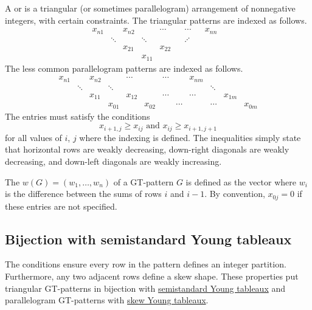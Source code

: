 A \label{gtPattern} or 
is a triangular (or sometimes parallelogram) arrangement of nonnegative integers,
with certain constraints.
The triangular patterns are indexed as follows.
\[
\begin{matrix}
x_{n1} & & x_{n2} & & \cdots & & \cdots & & x_{nn} \\
 & \ddots & & \ddots &  & &  \iddots &  & &  \\
   &  &   x_{21} &  & x_{22}\\
   &  &    & x_{11}
\end{matrix}
\]
The less common parallelogram patterns are indexed as follows.
\[
\begin{matrix}
x_{n1} & & x_{n2} & & \cdots & & \cdots & & x_{nm} \\
 & \ddots & & \ddots &  & &   & & & \ddots  \\
   &  &   x_{11} &  & x_{12} & & \cdots & & \cdots & & x_{1m} \\
   &  &    & x_{01} &    & x_{02} & & \cdots & & \cdots & & x_{0m}
\end{matrix}
\]
The entries must satisfy the conditions
\begin{equation*}
x_{i+1,j} \geq x_{ij} \text{ and } x_{ij} \geq x_{i+1,j+1}
\end{equation*}
for all values of $i$, $j$ where the indexing is defined.
The inequalities simply state that horizontal rows are weakly decreasing,
down-right diagonals are weakly decreasing, and down-left diagonals are weakly
increasing.

The \label{gtPatternWeight} $w(G) = (w_1,\dotsc,w_n)$ of a
GT-pattern $G$ is defined as the vector where $w_i$ is the difference between
the sums of rows $i$ and $i-1$.
By convention, $x_{0j}=0$ if these entries are not specified.


\subsection[gtpatternsAsSSYT]{Bijection with semistandard Young tableaux}

The conditions ensure every row in the pattern defines an integer partition.
Furthermore, any two adjacent rows define a skew shape.
These properties put triangular GT-patterns in bijection with
\hyperref[prelimTableaux]{semistandard Young tableaux} and parallelogram
GT-patterns with \hyperref[skewShapes]{skew Young tableaux}.

